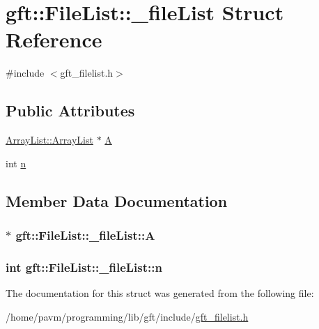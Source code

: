 \hypertarget{structgft_1_1FileList_1_1__fileList}{\section{gft\-:\-:File\-List\-:\-:\-\_\-file\-List Struct Reference}
\label{structgft_1_1FileList_1_1__fileList}
}


{\ttfamily \#include $<$gft\-\_\-filelist.\-h$>$}

\subsection*{Public Attributes}
\begin{DoxyCompactItemize}
\item 
\hyperlink{namespacegft_1_1ArrayList_a597298ec8b05430a184d37236b272878}{Array\-List\-::\-Array\-List} $\ast$ \hyperlink{structgft_1_1FileList_1_1__fileList_ae64cc6d54d5ca9556ca53e337e68a99a}{A}
\item 
int \hyperlink{structgft_1_1FileList_1_1__fileList_a08e909fcc411fd4379a2b3da0692d73e}{n}
\end{DoxyCompactItemize}


\subsection{Member Data Documentation}
\hypertarget{structgft_1_1FileList_1_1__fileList_ae64cc6d54d5ca9556ca53e337e68a99a}{
\subsubsection[{A}]{$\ast$ gft\-::\-File\-List\-::\-\_\-file\-List\-::\-A}}\label{structgft_1_1FileList_1_1__fileList_ae64cc6d54d5ca9556ca53e337e68a99a}
\hypertarget{structgft_1_1FileList_1_1__fileList_a08e909fcc411fd4379a2b3da0692d73e}{
\subsubsection[{n}]{\setlength{\rightskip}{0pt plus 5cm}int gft\-::\-File\-List\-::\-\_\-file\-List\-::n}}\label{structgft_1_1FileList_1_1__fileList_a08e909fcc411fd4379a2b3da0692d73e}


The documentation for this struct was generated from the following file\-:\begin{DoxyCompactItemize}
\item 
/home/pavm/programming/lib/gft/include/\hyperlink{gft__filelist_8h}{gft\-\_\-filelist.\-h}\end{DoxyCompactItemize}
